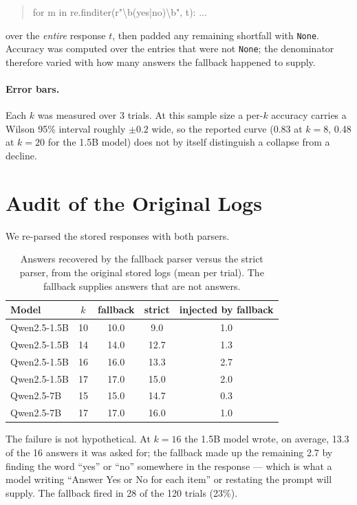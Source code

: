 \documentclass[preprint,12pt]{elsarticle}
\theoremstyle{plain}
\begin{document}
\begin{quote}\ttfamily
for m in re.finditer(r"\textbackslash b(yes|no)\textbackslash b", t): ...
\end{quote}

\noindent over the \emph{entire} response $t$, then padded any remaining shortfall with \texttt{None}. Accuracy was computed over the entries that were not \texttt{None}; the denominator therefore varied with how many answers the fallback happened to supply.

\paragraph{Error bars.} Each $k$ was measured over 3 trials. At this sample size a per-$k$ accuracy carries a Wilson 95\% interval roughly $\pm 0.2$ wide, so the reported curve (0.83 at $k=8$, 0.48 at $k=20$ for the 1.5B model) does not by itself distinguish a collapse from a decline.

\section{Audit of the Original Logs}
\label{sec:audit}

We re-parsed the stored responses with both parsers.

\begin{table}[H]
\centering
\small
\caption{Answers recovered by the fallback parser versus the strict parser, from the original stored logs (mean per trial). The fallback supplies answers that are not answers.}
\label{tab:fallback}
\begin{tabular}{lcccc}
\toprule
Model & $k$ & fallback & strict & injected by fallback \\
\midrule
Qwen2.5-1.5B & 10 & 10.0 & 9.0 & 1.0 \\
Qwen2.5-1.5B & 14 & 14.0 & 12.7 & 1.3 \\
Qwen2.5-1.5B & 16 & 16.0 & 13.3 & 2.7 \\
Qwen2.5-1.5B & 17 & 17.0 & 15.0 & 2.0 \\
Qwen2.5-7B   & 15 & 15.0 & 14.7 & 0.3 \\
Qwen2.5-7B   & 17 & 17.0 & 16.0 & 1.0 \\
\bottomrule
\end{tabular}
\end{table}

The failure is not hypothetical. At $k=16$ the 1.5B model wrote, on average, 13.3 of the 16 answers it was asked for; the fallback made up the remaining 2.7 by finding the word ``yes'' or ``no'' somewhere in the response --- which is what a model writing ``Answer Yes or No for each item'' or restating the prompt will supply. The fallback fired in 28 of the 120 trials (23\%).
\end{document}
